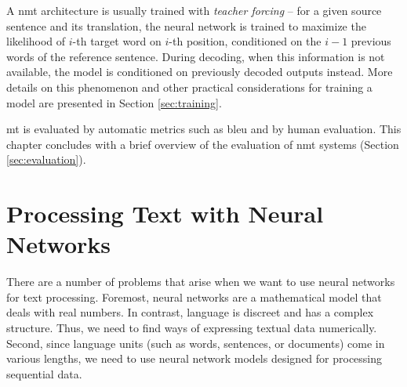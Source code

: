 A \gls{nmt} architecture is usually trained with \emph{teacher forcing} -- for
a given source sentence and its translation, the neural network is trained to
maximize the likelihood of $i$-th target word on $i$-th position, conditioned
on the $i-1$ previous words of the reference sentence. During decoding, when
this information is not available, the model is conditioned on previously
decoded outputs instead. More details on this phenomenon and other practical
considerations for training a model are presented in Section
\ref{sec:training}. 






\Gls{mt} is evaluated by automatic metrics such as \acrshort{bleu} and by human
evaluation. This chapter concludes with a brief overview of the evaluation of
\gls{nmt} systems (Section \ref{sec:evaluation}).





\section{Processing Text with Neural Networks}
\label{sec:text-processing}

There are a number of problems that arise when we want to use neural networks
for text processing. Foremost, neural networks are a mathematical model that
deals with real numbers. In contrast, language is discreet and has a complex
structure. Thus, we need to find ways of expressing textual data
numerically. Second, since language units (such as words, sentences, or
documents) come in various lengths, we need to use neural network models
designed for processing sequential data.

